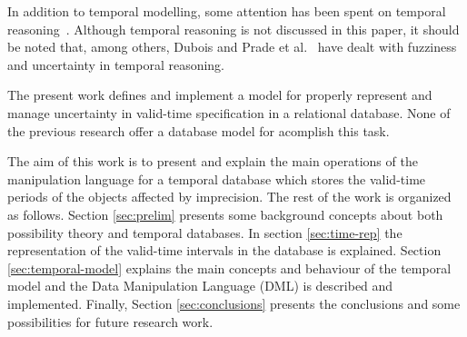 In addition to temporal modelling, some attention has been spent on temporal reasoning~\cite{Allen1983}. Although temporal reasoning is not discussed in this paper, it should be noted that, among others, Dubois and Prade et al.~\cite{Dubois2003,DuBois1989} have dealt with fuzziness and uncertainty in temporal reasoning.

The present work defines and implement a model for properly represent and manage uncertainty in valid-time specification in a relational database. None of the previous research offer a database model for acomplish this task.

The aim of this work is to present and explain the main operations of the manipulation language for a temporal database which stores the valid-time periods of the objects affected by imprecision. The rest of the work is organized as follows. Section \ref{sec:prelim} presents some background concepts about both possibility theory and temporal databases. In section \ref{sec:time-rep} the representation of the valid-time intervals in the database is explained. Section \ref{sec:temporal-model} explains the main concepts and behaviour of the temporal model and the Data Manipulation Language (DML) is described and implemented. Finally, Section \ref{sec:conclusions} presents the conclusions and some possibilities for future research work.


